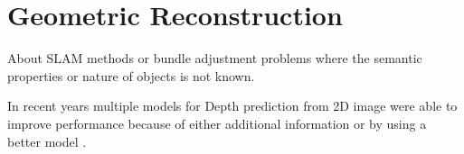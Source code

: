 \section{Geometric Reconstruction}
\label{sec:geometric_reconstruction}

About SLAM methods or bundle adjustment problems where the semantic properties or nature of objects is not known.

In recent years multiple models for Depth prediction from 2D image were able to improve performance because of either additional information or by using a better model \cite{jiao2018look,tatarchenko2019single,kendall2018multi}.
